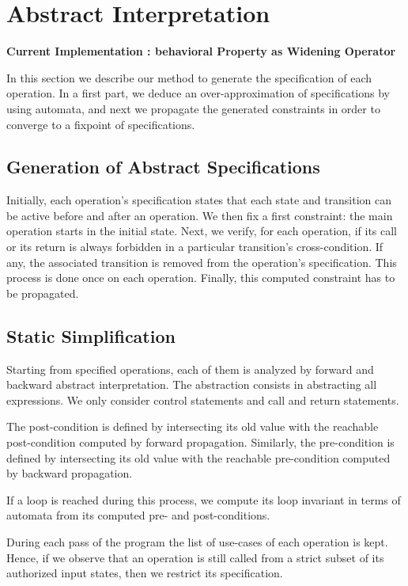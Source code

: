 \documentclass{report}
\begin{document}
\section{Abstract Interpretation}
{\bf Current Implementation : behavioral Property as Widening Operator}

  In this section we describe our method to generate the specification of each
  operation. In a first part, we deduce an over-approximation of specifications
  by using automata, and next we propagate the generated constraints in order to
  converge to a fixpoint of specifications.

\subsection{Generation of Abstract Specifications}
Initially, each operation's specification states that each state and transition
can be active before and after an operation.
We then fix a first constraint: the main operation starts in the initial
state. Next, we verify, for each operation, if its call or its return is always
forbidden in a particular transition's cross-condition. If any, the associated
transition is removed from the operation's specification. This process is done
once on each operation. Finally, this computed constraint has to be propagated.

\subsection{Static Simplification}
Starting from specified operations, each of them is analyzed by forward and
backward abstract interpretation. The abstraction consists in abstracting all
expressions. We only consider control statements and call and return
statements.

The post-condition is defined by intersecting its old value with the reachable
post-condition computed by forward propagation. Similarly, the pre-condition is
defined by intersecting its old value with the reachable pre-condition computed
by backward propagation.

If a loop is reached during this process, we compute its loop invariant in
terms of automata from its computed pre- and post-conditions.

During each pass of the program the list of use-cases of each operation is
kept. Hence, if we observe that an operation is still called from a strict
subset of its authorized input states, then we restrict its specification.
\end{document}
